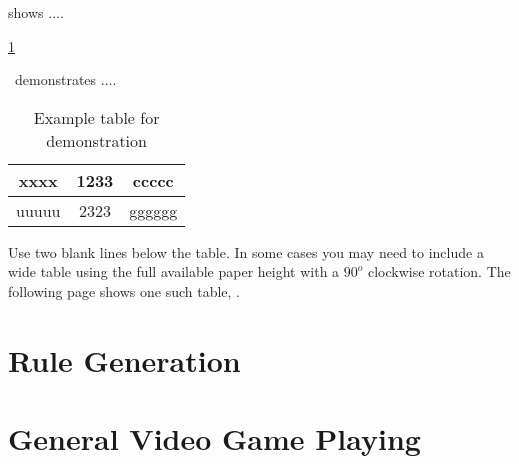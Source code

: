  shows $\ldots$.


\ref{table:l1}

~demonstrates $\ldots$.


\begin{table}
 \label{table:l1}
 \centering
 \caption{Example table for demonstration}
 \begin{tabular}{|c|c|c|}\\
 xxxx & 1233 & ccccc\\ \hline
 uuuuu & 2323 & gggggg\\ \hline
 \end{tabular}

\end{table}

						
					


Use two blank lines below the table. In some cases you may need to include a wide table using the full available paper height with a $90^{o}$ clockwise rotation. 
The following page shows one such table, .


\begin{landscape}
\end{landscape}


\section{Rule Generation}

\section{General Video Game Playing}